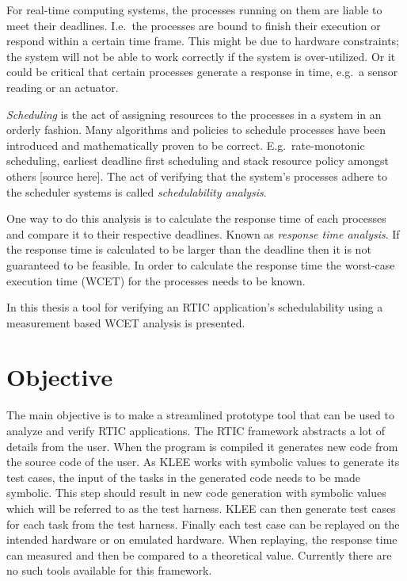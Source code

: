 For real-time computing systems, the processes running on them are liable to
meet their deadlines. I.e.\ the processes are bound to finish their execution
or respond within a certain time frame. This might be due to hardware
constraints; the system will not be able to work correctly if the system is
over-utilized. Or it could be critical that certain processes generate a
response in time, e.g.\ a sensor reading or an actuator.

\emph{Scheduling} is the act of assigning resources to the processes in a
system in an orderly fashion. Many algorithms and policies to schedule
processes have been introduced and mathematically proven to be correct. E.g.\
rate-monotonic scheduling, earliest deadline first scheduling and stack
resource policy amongst others [source here]. The act of verifying that the
system's processes adhere to the scheduler systems is called 
\emph{schedulability analysis}.

One way to do this analysis is to calculate the response time of each processes
and compare it to their respective deadlines. Known as \emph{response time analysis}.
If the response time is calculated to be larger than the deadline then it is not
guaranteed to be feasible. In order to calculate the response time the
worst-case execution time (WCET) for the processes needs to be known. 

In this thesis a tool for verifying an RTIC application's schedulability using a
measurement based WCET analysis is presented. 

\section{Objective}
The main objective is to make a streamlined prototype tool that can be used to
analyze and verify RTIC applications. The RTIC framework abstracts a lot of
details from the user. When the program is compiled it generates new code from
the source code of the user. As KLEE works with symbolic values to generate its
test cases, the input of the tasks in the generated code needs to be made
symbolic. This step should result in new code generation with symbolic values
which will be referred to as the test harness. KLEE can then generate test
cases for each task from the test harness. Finally each test case can be
replayed on the intended hardware or on emulated hardware. When replaying, the
response time can measured and then be compared to a theoretical value.
Currently there are no such tools available for this framework.

